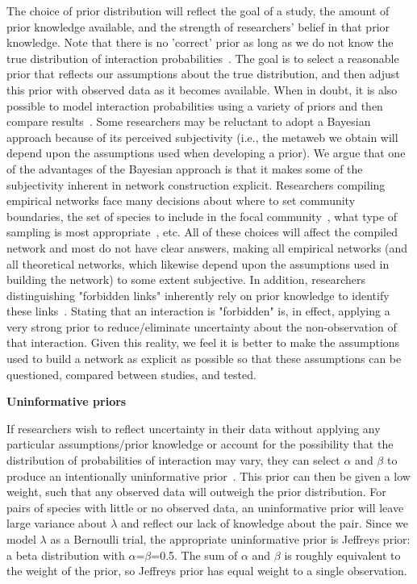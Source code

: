 \documentclass[12pt]{article}
\begin{document}
\begin{spacing}{2.0}
      The choice of prior distribution will reflect the goal of a study, the amount of prior knowledge available, and the strength of researchers' belief in that prior knowledge. Note that there is no 'correct' prior as long as we do not know the true distribution of interaction probabilities~\citep{Spiegelhalter2000}. The goal is to select a reasonable prior that reflects our assumptions about the true distribution, and then adjust this prior with observed data as it becomes available. When in doubt, it is also possible to model interaction probabilities using a variety of priors and then compare results~\citep{Spiegelhalter2000}. Some researchers may be reluctant to adopt a Bayesian approach because of its perceived subjectivity (i.e., the metaweb we obtain will depend upon the assumptions used when developing a prior). We argue that one of the advantages of the Bayesian approach is that it makes some of the subjectivity inherent in network construction explicit. Researchers compiling empirical networks face many decisions about where to set community boundaries, the set of species to include in the focal community~\citep{Jordano2016}, what type of sampling is most appropriate~\citep{Wirta2014}, etc. All of these choices will affect the compiled network and most do not have clear answers, making all empirical networks (and all theoretical networks, which likewise depend upon the assumptions used in building the network) to some extent subjective. In addition, researchers distinguishing "forbidden links" inherently rely on prior knowledge to identify these links~\citep{Jordano2016}. Stating that an interaction is "forbidden" is, in effect, applying a very strong prior to reduce/eliminate uncertainty about the non-observation of that interaction. Given this reality, we feel it is better to make the assumptions used to build a network as explicit as possible so that these assumptions can be questioned, compared between studies, and tested. 


      \textbf{Uninformative priors}

        If researchers wish to reflect uncertainty in their data without applying any particular assumptions/prior knowledge or account for the possibility that the distribution of probabilities of interaction may vary, they can select $\alpha$ and $\beta$ to produce an intentionally uninformative prior~\citep{Leyland2005,Berger2006}. This prior can then be given a low weight, such that any observed data will outweigh the prior distribution. For pairs of species with little or no observed data, an uninformative prior will leave large variance about $\lambda$ and reflect our lack of knowledge about the pair. Since we model $\lambda$ as a Bernoulli trial, the appropriate uninformative prior is Jeffreys prior: a beta distribution with $\alpha$=$\beta$=0.5. The sum of $\alpha$ and $\beta$ is roughly equivalent to the weight of the prior, so Jeffreys prior has equal weight to a single observation. 



\end{spacing}
\end{document}
